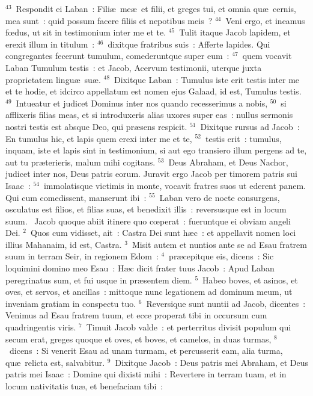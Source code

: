 ${}^{43}$~Respondit ei Laban~: Fili\ae\ me\ae\ et filii, et greges tui, et omnia qu\ae\ cernis, mea sunt~: quid possum facere filiis et nepotibus meis~?
${}^{44}$~Veni ergo, et ineamus fœdus, ut sit in testimonium inter me et te.
${}^{45}$~Tulit itaque Jacob lapidem, et erexit illum in titulum~:
${}^{46}$~dixitque fratribus suis~: Afferte lapides. Qui congregantes fecerunt tumulum, comederuntque super eum~:
${}^{47}$~quem vocavit Laban Tumulum testis~: et Jacob, Acervum testimonii, uterque juxta proprietatem lingu\ae\ su\ae .
${}^{48}$~Dixitque Laban~: Tumulus iste erit testis inter me et te hodie, et idcirco appellatum est nomen ejus Galaad, id est, Tumulus testis.
${}^{49}$~Intueatur et judicet Dominus inter nos quando recesserimus a nobis,
${}^{50}$~si afflixeris filias meas, et si introduxeris alias uxores super eas~: nullus sermonis nostri testis est absque Deo, qui pr\ae sens respicit.
${}^{51}$~Dixitque rursus ad Jacob~: En tumulus hic, et lapis quem erexi inter me et te,
${}^{52}$~testis erit~: tumulus, inquam, iste et lapis sint in testimonium, si aut ego transiero illum pergens ad te, aut tu pr\ae terieris, malum mihi cogitans.
${}^{53}$~Deus Abraham, et Deus Nachor, judicet inter nos, Deus patris eorum. Juravit ergo Jacob per timorem patris sui Isaac~:
${}^{54}$~immolatisque victimis in monte, vocavit fratres suos ut ederent panem. Qui cum comedissent, manserunt ibi~:
${}^{55}$~Laban vero de nocte consurgens, osculatus est filios, et filias suas, et benedixit illis~: reversusque est in locum suum.
~Jacob quoque abiit itinere quo cœperat~: fueruntque ei obviam angeli Dei.
${}^{2}$~Quos cum vidisset, ait~: Castra Dei sunt h\ae c~: et appellavit nomen loci illius Mahanaim, id est, Castra.
${}^{3}$~Misit autem et nuntios ante se ad Esau fratrem suum in terram Seir, in regionem Edom~:
${}^{4}$~pr\ae cepitque eis, dicens~: Sic loquimini domino meo Esau~: H\ae c dicit frater tuus Jacob~: Apud Laban peregrinatus sum, et fui usque in pr\ae sentem diem.
${}^{5}$~Habeo boves, et asinos, et oves, et servos, et ancillas~: mittoque nunc legationem ad dominum meum, ut inveniam gratiam in conspectu tuo.
${}^{6}$~Reversique sunt nuntii ad Jacob, dicentes~: Venimus ad Esau fratrem tuum, et ecce properat tibi in occursum cum quadringentis viris.
${}^{7}$~Timuit Jacob valde~: et perterritus divisit populum qui secum erat, greges quoque et oves, et boves, et camelos, in duas turmas,
${}^{8}$~dicens~: Si venerit Esau ad unam turmam, et percusserit eam, alia turma, qu\ae\ relicta est, salvabitur.
${}^{9}$~Dixitque Jacob~: Deus patris mei Abraham, et Deus patris mei Isaac~: Domine qui dixisti mihi~: Revertere in terram tuam, et in locum nativitatis tu\ae , et benefaciam tibi~:
